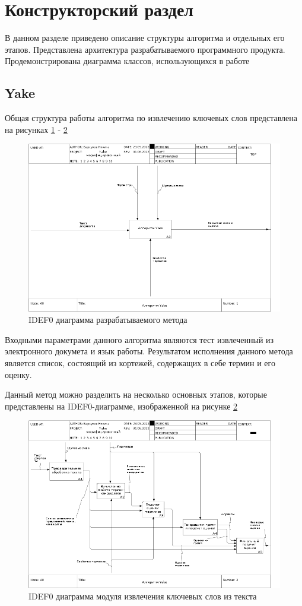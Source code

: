 \section{Конструкторский раздел}
В данном разделе приведено описание структуры алгоритма и отдельных его этапов.
Представлена архитектура разрабатываемого программного продукта.
Продемонстрирована диаграмма классов, использующихся в работе

\subsection{Yake}
Общая структура работы алгоритма по извлечению ключевых слов представлена на рисунках \ref{fig:01a0} - \ref{fig:02a0}
\begin{figure}[!h]
	\centering
	\includegraphics[width=1\linewidth]{src/img/idef0/Yake/01_A0}
	\caption{IDEF0 диаграмма разрабатываемого метода}
	\label{fig:01a0}
\end{figure}
Входными параметрами данного алгоритма являются тест извлеченный из электронного докумета и язык работы.
Результатом исполнения данного метода является список, состоящий из кортежей, содержащих в себе термин и его оценку.

Данный метод можно разделить на несколько основных этапов, которые представлены на IDEF0-диаграмме, изображенной на рисунке \ref{fig:02a0}
\begin{figure}[!h]
	\centering
	\includegraphics[width=1\linewidth]{src/img/idef0/Yake/02_A0}
	\caption{IDEF0 диаграмма модуля извлечения ключевых слов из текста}
	\label{fig:02a0}
\end{figure}

